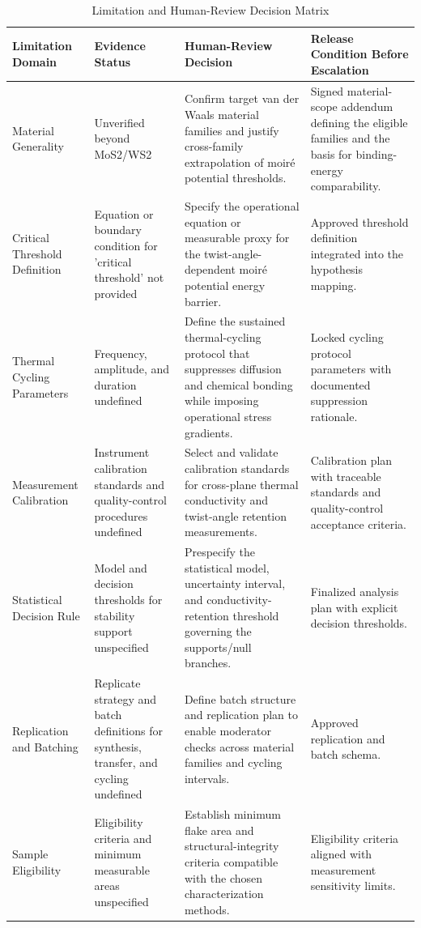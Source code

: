 \documentclass[conference]{IEEEtran}
\begin{document}
\begin{table}[htbp]
\centering
\footnotesize
\setlength{\tabcolsep}{3pt}
\renewcommand{\arraystretch}{1.12}
\caption{Limitation and Human-Review Decision Matrix}
\label{tab:risk-limitations-and-review-rlr-02}
\begin{tabular}{|p{}|p{}|p{}|p{}|}
\hline
Limitation Domain & Evidence Status & Human-Review Decision & Release Condition Before Escalation \\\hline
Material Generality & Unverified beyond MoS2/WS2 & Confirm target van der Waals material families and justify cross-family extrapolation of moiré potential thresholds. & Signed material-scope addendum defining the eligible families and the basis for binding-energy comparability. \\\hline
Critical Threshold Definition & Equation or boundary condition for 'critical threshold' not provided & Specify the operational equation or measurable proxy for the twist-angle-dependent moiré potential energy barrier. & Approved threshold definition integrated into the hypothesis mapping. \\\hline
Thermal Cycling Parameters & Frequency, amplitude, and duration undefined & Define the sustained thermal-cycling protocol that suppresses diffusion and chemical bonding while imposing operational stress gradients. & Locked cycling protocol parameters with documented suppression rationale. \\\hline
Measurement Calibration & Instrument calibration standards and quality-control procedures undefined & Select and validate calibration standards for cross-plane thermal conductivity and twist-angle retention measurements. & Calibration plan with traceable standards and quality-control acceptance criteria. \\\hline
Statistical Decision Rule & Model and decision thresholds for stability support unspecified & Prespecify the statistical model, uncertainty interval, and conductivity-retention threshold governing the supports/null branches. & Finalized analysis plan with explicit decision thresholds. \\\hline
Replication and Batching & Replicate strategy and batch definitions for synthesis, transfer, and cycling undefined & Define batch structure and replication plan to enable moderator checks across material families and cycling intervals. & Approved replication and batch schema. \\\hline
Sample Eligibility & Eligibility criteria and minimum measurable areas unspecified & Establish minimum flake area and structural-integrity criteria compatible with the chosen characterization methods. & Eligibility criteria aligned with measurement sensitivity limits. \\\hline
\end{tabular}
\end{table}~\cite{cite_26ecaf73d88dfe33}
\end{document}

